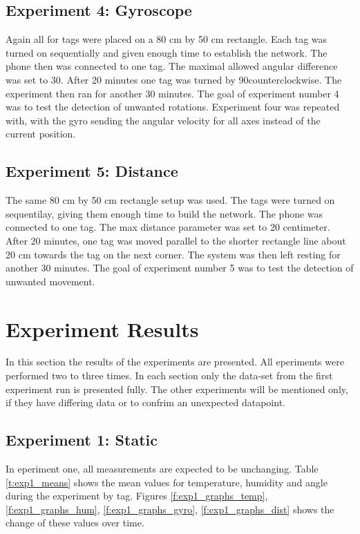 \subsection{Experiment 4: Gyroscope}
\label{ss:exp_4_1}
Again all for tags were placed on a 80 cm by 50 cm rectangle.
Each tag was turned on sequentially and given enough time to establish the network.
The phone then was connected to one tag.
The maximal allowed angular difference was set to 30\degree .
After 20 minutes one tag was turned by 90\degree counterclockwise.
The experiment then ran for another 30 minutes.
The goal of experiment number 4 was to test the detection of unwanted rotations.
Experiment four was repeated with, with the gyro sending the angular velocity for all axes instead of the current position.


\subsection{Experiment 5: Distance}
\label{ss:exp_5}
The same 80 cm by 50 cm rectangle setup was used.
The tags were turned on sequentilay, giving them enough time to build the network.
The phone was connected to one tag.
The max distance parameter was set to 20 centimeter.
After 20 minutes, one tag was moved parallel to the shorter rectangle line about 20 cm towards the tag on the next corner.
The system was then left resting for another 30 minutes.
The goal of experiment number 5 was to test the detection of unwanted movement.

\section{Experiment Results}
\label{s:exp_res}

In this section the results of the experiments are presented.
All eperiments were performed two to three times.
In each section only the data-set from the first experiment run is presented fully.
The other experiments will be mentioned only, if they have differing data or to confrim an unexpected datapoint.

\subsection{Experiment 1: Static}
\label{ss:exp_1_result}
In eperiment one, all measurements are expected to be unchanging.
Table \ref{t:exp1_means} shows the mean values for temperature, humidity and angle during the experiment by tag.
Figures \ref{f:exp1_graphs_temp}, \ref{f:exp1_graphs_hum}, \ref{f:exp1_graphs_gyro}, \ref{f:exp1_graphs_dist} shows the change of these values over time.

